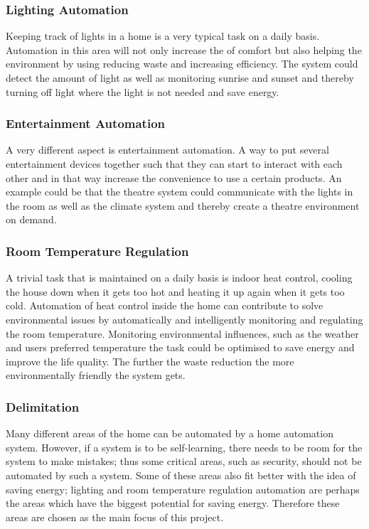 \subsubsection{Lighting Automation}
\label{sub:Lighting Automation}
Keeping track of lights in a home is a very typical task on a daily basis. Automation in this area will not only increase the of comfort but also helping the environment by using reducing waste and increasing efficiency. The system could detect the amount of light as well as monitoring sunrise and sunset and thereby turning off light where the light is not needed and save energy.

\subsubsection{Entertainment Automation} 
\label{sub:Entertainment Automation}
A very different aspect is entertainment automation. A way to put several entertainment devices together such that they can start to interact with each other and in that way increase the convenience to use a certain products. An example could be that the theatre system could communicate with the lights in the room as well as the climate system and thereby create a theatre environment on demand.

\subsubsection{Room Temperature Regulation}
\label{sub:Room Temperature Regulation}
A trivial task that is maintained on a daily basis is indoor heat control, cooling the house down when it gets too hot and heating it up again when it gets too cold. Automation of heat control inside the home can contribute to solve environmental issues by automatically and intelligently monitoring and regulating the room temperature. Monitoring environmental influences, such as the weather and users preferred temperature the task could be optimised to save energy and improve the life quality. The further the waste reduction the more environmentally friendly the system gets.

\subsubsection{Delimitation}
Many different areas of the home can be automated by a home automation system. However, if a system is to be self-learning, there needs to be room for the system to make mistakes; thus some critical areas, such as security, should not be automated by such a system. Some of these areas also fit better with the idea of saving energy; lighting and room temperature regulation automation are perhaps the areas which have the biggest potential for saving energy. Therefore these areas are chosen as the main focus of this project.
